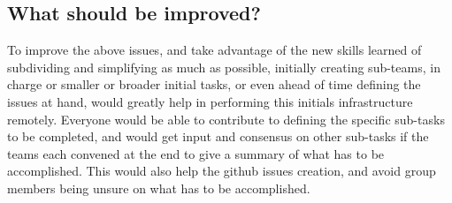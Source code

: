 \documentclass[letterpaper]{article}
\begin{document}
\subsection{What should be improved?}
To improve the above issues, and take advantage of the new skills learned of subdividing and simplifying as much as possible, initially creating sub-teams, in charge or smaller or broader initial tasks, or even ahead of time defining the issues at hand, would greatly help in performing this initials infrastructure remotely. Everyone would be able to contribute to defining the specific sub-tasks to be completed, and would get input and consensus on other sub-tasks if the teams each convened at the end to give a summary of what has to be accomplished. This would also help the github issues creation, and avoid group members being unsure on what has to be accomplished.
\end{document}

